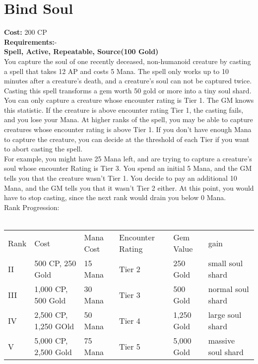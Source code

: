 \section{Bind Soul}\label{spell:bindSoul}
\textbf{Cost:} 200 CP\\
\textbf{Requirements:}-\\
\textbf{Spell, Active, Repeatable, Source(100 Gold)}\\
You capture the soul of one recently deceased, non-humanoid creature by casting a spell that takes 12 AP and costs 5 Mana.
The spell only works up to 10 minutes after a creature's death, and a creature's soul can not be captured twice.
Casting this spell transforms a gem worth 50 gold or more into a tiny soul shard.\\
You can only capture a creature whose encounter rating is Tier 1.
The GM knows this statistic.
If the creature is above encounter rating Tier 1, the casting fails, and you lose your Mana.
At higher ranks of the spell, you may be able to capture creatures whose encounter rating is above Tier 1.
If you don't have enough Mana to capture the creature, you can decide at the threshold of each Tier if you want to abort casting the spell.\\
For example, you might have 25 Mana left, and are trying to capture a creature's soul whose encounter Rating is Tier 3.
You spend an initial 5 Mana, and the GM tells you that the creature wasn't Tier 1.
You decide to pay an additional 10 Mana, and the GM tells you that it wasn't Tier 2 either.
At this point, you would have to stop casting, since the next rank would drain you below 0 Mana.
\\
Rank Progression:\\
\\
\begin{longtable}{l | l | l | l | l | l}
    Rank & Cost & Mana Cost & Encounter Rating & Gem Value & gain\\
    II & 500 CP, 250 Gold & 15 Mana & Tier 2 & 250 Gold & small soul shard\\
    III & 1,000 CP, 500 Gold & 30 Mana & Tier 3 & 500 Gold & normal soul shard\\
    IV & 2,500 CP, 1,250 GOld & 50 Mana & Tier 4 & 1,250 Gold & large soul shard\\
    V & 5,000 CP, 2,500 Gold & 75 Mana & Tier 5 & 5,000 Gold & massive soul shard\\
\end{longtable}
